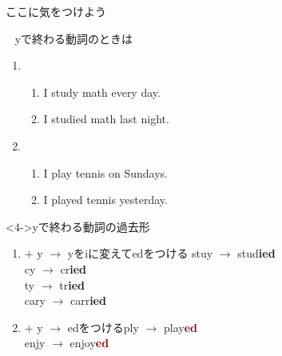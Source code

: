\documentclass[aspectratio=169,xcolor={dvipsnames,table}]{beamer}
\begin{document}
\begin{frame}[plain]{ここに気をつけよう}
 
\dbend\,\,\,\,\,yで終わる動詞のときは

\begin{enumerate}
 \item<1-> \begin{enumerate}
	\item<1-> I study math every day.
	\item<2-> I studied math last night.
       \end{enumerate}
 \item<1-> \begin{enumerate}
	\item<1-> I play tennis on Sundays.
	\item<3-> I played tennis yesterday.
       \end{enumerate}
\end{enumerate}

\begin{block}<4->{yで終わる動詞の過去形}\small
 \begin{enumerate}
  \item<5->  $+$ y $\longrightarrow$ yをiに変えてedをつける%
\hfill{}stuy $\rightarrow$ stud\textcolor{NavyBlue}{\bfseries ied}\\
\hfill{}cy $\rightarrow$ cr\textcolor{NavyBlue}{\bfseries ied}\\
\hfill{}ty $\rightarrow$ tr\textcolor{NavyBlue}{\bfseries ied}\\
\hfill{}cary $\rightarrow$ carr\textcolor{NavyBlue}{\bfseries ied}
  \item<6->  $+$ y $\longrightarrow$ edをつける\hfill{}ply $\rightarrow$ play\textcolor{Maroon}{\bfseries ed}\\
\hfill{}enjy $\rightarrow$ enjoy\textcolor{Maroon}{\bfseries ed}
 \end{enumerate}
\end{block}
\end{frame}
\end{document}

